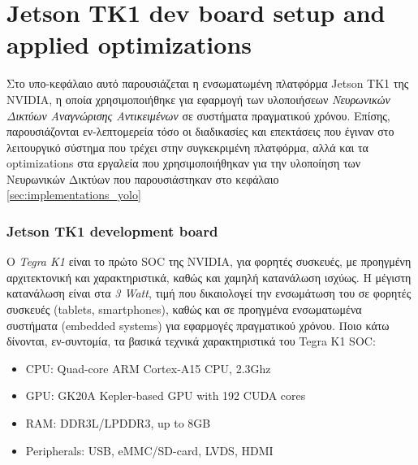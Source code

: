 \section{Jetson TK1 dev board setup and applied optimizations}
\label{sec:implementations_jetson}

Στο υπο-κεφάλαιο αυτό παρουσιάζεται η ενσωματωμένη πλατφόρμα Jetson TK1 της NVIDIA,
η οποία χρησιμοποιήθηκε για εφαρμογή των υλοποιήσεων \emph{Νευρωνικών Δικτύων Αναγνώρισης
Αντικειμένων} σε συστήματα πραγματικού χρόνου.
Επίσης, παρουσιάζονται εν-λεπτομερεία τόσο οι διαδικασίες και επεκτάσεις που έγιναν στο
λειτουργικό σύστημα που τρέχει στην συγκεκριμένη πλατφόρμα, αλλά και τα optimizations
στα εργαλεία που χρησιμοποιήθηκαν για την υλοποίηση των Νευρωνικών Δικτύων που
παρουσιάστηκαν στο κεφάλαιο \ref{sec:implementations_yolo}

\subsubsection{Jetson TK1 development board}

Ο \emph{Tegra K1} είναι το πρώτο SOC της NVIDIA, για φορητές συσκευές, με προηγμένη αρχιτεκτονική
και χαρακτηριστικά, καθώς και χαμηλή κατανάλωση ισχύως. H μέγιστη κατανάλωση είναι στα \emph{3 Watt},
τιμή που δικαιολογεί την ενσωμάτωση του σε φορητές συσκευές (tablets, smartphones), καθώς και
σε προηγμένα ενσωματωμένα συστήματα (embedded systems) για εφαρμογές πραγματικού χρόνου.
Ποιο κάτω δίνονται, εν-συντομία, τα βασικά τεχνικά χαρακτηριστικά του Tegra K1 SOC:
\begin{itemize}
  \item{CPU: Quad-core ARM Cortex-A15 CPU, 2.3Ghz}
  \item{GPU: GK20A Kepler-based GPU with 192 CUDA cores}
  \item{RAM: DDR3L/LPDDR3, up to 8GB}
  \item{Peripherals: USB, eMMC/SD-card, LVDS, HDMI}
\end{itemize}

